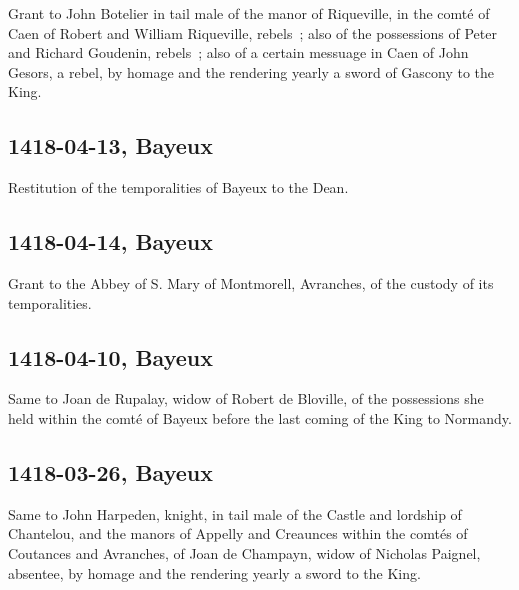 \documentclass[a4paper,12pt,twoside]{book}
\begin{document}
                
                     Grant to John Botelier in tail male of the manor of Riqueville, in the comté of Caen of Robert and William Riqueville, rebels ; also of the possessions of Peter and Richard Goudenin, rebels ; also of a certain messuage in Caen of John Gesors, a rebel, by homage and the rendering yearly a sword of Gascony to the King.
                  
                
                \subsection{1418-04-13, Bayeux}
                
                
                     Restitution of the temporalities of Bayeux to the Dean.
                  
                
                \subsection{1418-04-14, Bayeux}
                
                
                     Grant to the Abbey of S. Mary of Montmorell, Avranches, of the custody of its temporalities.
                  
                
                \subsection{1418-04-10, Bayeux}
                
                
                     Same to Joan de Rupalay, widow of Robert de Bloville, of the possessions she held within the comté of Bayeux before the last coming of the King to Normandy.
                  
                
                \subsection{1418-03-26, Bayeux}
                
                
                     Same to John Harpeden, knight, in tail male of the Castle and lordship of Chantelou, and the manors of Appelly and Creaunces within the comtés of Coutances and Avranches, of Joan de Champayn, widow of Nicholas Paignel, absentee, by homage and the rendering yearly a sword to the King.
                  
\end{document}
